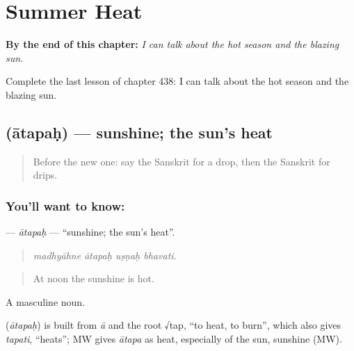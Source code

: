 
\chapter{Summer Heat}
\label{ch:sa-summer-heat}

\begin{chapteropening}
\textbf{By the end of this chapter:} \emph{I can talk about the hot season and the blazing sun.}

Complete the last lesson of chapter 438: I can talk about the hot season and the blazing sun.
\end{chapteropening}

\section[\texorpdfstring{\sk{आतपः} (ātapaḥ)}{आतपः (ātapaḥ)}]{ (ātapaḥ) — sunshine; the sun's heat}

\label{lesson:SA-C438-atapah}



\begin{quote}
Before the new one: say the Sanskrit for a drop, then the Sanskrit for drips.
\end{quote}

\subsection*{You'll want to know: }
\textbf{} — \emph{ātapaḥ} — \textquotedblleft{}sunshine; the sun's heat\textquotedblright{}.

\begin{quote}
   
\end{quote}

\begin{quote}
\emph{madhyāhne ātapaḥ uṣṇaḥ bhavati.}
\end{quote}

\begin{quote}
At noon the sunshine is hot.
\end{quote}

A masculine noun.

\begin{cousinweb}
\textbf{} (\emph{ātapaḥ}) is built from \emph{ā} and the root √tap, \textquotedblleft{}to heat, to burn\textquotedblright{}, which also gives \emph{tapati}, \textquotedblleft{}heats\textquotedblright{}; MW gives \emph{ātapa} as heat, especially of the sun, sunshine (MW).
\end{cousinweb}

